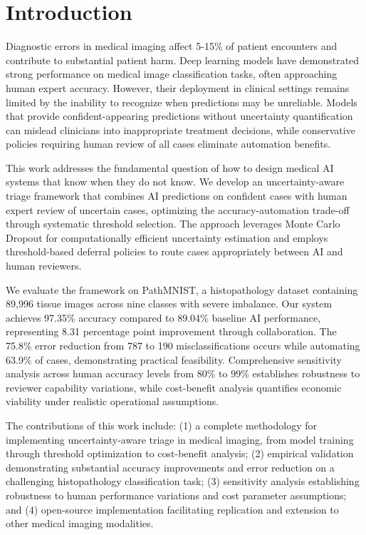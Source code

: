 \documentclass[10pt,a4paper]{article}
\begin{document}
\clearpage

\setcounter{page}{1}

\section{Introduction}

Diagnostic errors in medical imaging affect 5-15\% of patient encounters and contribute to substantial patient harm. Deep learning models have demonstrated strong performance on medical image classification tasks, often approaching human expert accuracy. However, their deployment in clinical settings remains limited by the inability to recognize when predictions may be unreliable. Models that provide confident-appearing predictions without uncertainty quantification can mislead clinicians into inappropriate treatment decisions, while conservative policies requiring human review of all cases eliminate automation benefits.

This work addresses the fundamental question of how to design medical AI systems that know when they do not know. We develop an uncertainty-aware triage framework that combines AI predictions on confident cases with human expert review of uncertain cases, optimizing the accuracy-automation trade-off through systematic threshold selection. The approach leverages Monte Carlo Dropout for computationally efficient uncertainty estimation and employs threshold-based deferral policies to route cases appropriately between AI and human reviewers.

We evaluate the framework on PathMNIST, a histopathology dataset containing 89,996 tissue images across nine classes with severe imbalance. Our system achieves 97.35\% accuracy compared to 89.04\% baseline AI performance, representing 8.31 percentage point improvement through collaboration. The 75.8\% error reduction from 787 to 190 misclassifications occurs while automating 63.9\% of cases, demonstrating practical feasibility. Comprehensive sensitivity analysis across human accuracy levels from 80\% to 99\% establishes robustness to reviewer capability variations, while cost-benefit analysis quantifies economic viability under realistic operational assumptions.

The contributions of this work include: (1) a complete methodology for implementing uncertainty-aware triage in medical imaging, from model training through threshold optimization to cost-benefit analysis; (2) empirical validation demonstrating substantial accuracy improvements and error reduction on a challenging histopathology classification task; (3) sensitivity analysis establishing robustness to human performance variations and cost parameter assumptions; and (4) open-source implementation facilitating replication and extension to other medical imaging modalities.
\end{document}
